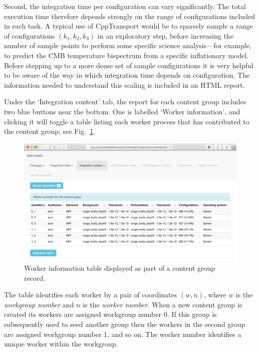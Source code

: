 \documentclass[11pt,a4paper]{article}
\newcommand{\packagefont}{\sffamily}
\newcommand{\CppTransport}{{\packagefont CppTransport}}
\newcommand{\semibold}[1]{{\fontseries{b}\selectfont{#1}}}
\newcommand{\para}[1]{\par\vspace{2mm}\noindent\semibold{{#1.}---}\ignorespaces}
\begin{document}
Second, the integration time per configuration can vary significantly.
The total execution time therefore depends strongly
on the range of configurations included in each task.
A typical use of {\CppTransport} would be to sparsely sample a range
of configurations $(k_1, k_2, k_3)$
in an exploratory step, before increasing
the number of sample points to perform some specific science
analysis---for example, to predict the CMB temperature bispectrum
from a specific inflationary model.
Before stepping up to a more dense set of sample configurations
it is very helpful to be aware of the
way in which
integration time depends on configuration.
The information needed to understand this scaling
is included in an HTML report.

\para{Worker information table}
Under the `Integration content' tab, the report for each content group
includes two blue buttons near the bottom.
One is labelled `Worker information', and clicking it will toggle
a table listing each worker process that has contributed to the
content group; see Fig.~\ref{fig:worker-info}.
\begin{figure}
    \begin{center}
        \includegraphics[scale=0.18]{Screenshots/worker-info}    
    \end{center}
    \caption{\label{fig:worker-info}Worker information table displayed as
    part of a content group record.}
\end{figure}
The table identifies each worker by a pair of coordinates
$(w, n)$,
where $w$ is the \emph{workgroup number}
and $n$ is the \emph{worker number}.
When a new content group is created its workers are assigned
workgroup number 0.
If this group is subsequently used to seed another group then the workers
in the second group are assigned workgroup number 1, and so on.
The worker number identifies a unique worker within the workgroup.
\end{document}
